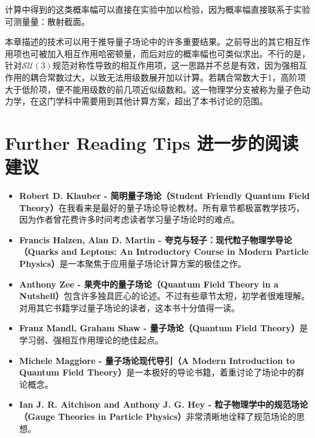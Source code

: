 计算中得到的这类概率幅可以直接在实验中加以检验，因为概率幅直接联系于实验可测量量：散射截面。

本章描述的技术可以用于推导量子场论中的许多重要结果。之前导出的其它相互作用项也可被加入相互作用哈密顿量，而后对应的概率幅也可类似求出。不行的是，针对$\mathcal{SU}(3)$规范对称性导致的相互作用项，这一思路并不总是有效，因为强相互作用的耦合常数过大，以致无法用级数展开加以计算。若耦合常数大于1，高阶项大于低阶项，便不能用级数的前几项近似级数和。这一物理学分支被称为量子色动力学，在这门学科中需要用到其他计算方案，超出了本书讨论的范围。

\section*{Further Reading Tips 进一步的阅读建议}
\begin{itemize}
\item \textbf{Robert D. Klauber - 简明量子场论（Student Friendly Quantum Field Theory）}在我看来是最好的量子场论导论教材。所有章节都极富教学技巧，因为作者曾花费许多时间考虑读者学习量子场论时的难点。
\item \textbf{Francis Halzen, Alan D. Martin - 夸克与轻子：现代粒子物理学导论（Quarks and Leptons: An Introductory Course in Modern Particle Physics）}是一本聚焦于应用量子场论计算方案的极佳之作。
\item \textbf{Anthony Zee - 果壳中的量子场论（Quantum Field Theory in a Nutshell）}包含许多独具匠心的论述。不过有些章节太短，初学者很难理解。对用其它书籍学过量子场论的读者，这本书十分值得一读。
\item \textbf{Franz Mandl, Graham Shaw - 量子场论（Quantum Field Theory）}是学习弱、强相互作用理论的绝佳起点。
\item \textbf{Michele Maggiore - 量子场论现代导引（A Modern Introduction to Quantum Field Theory）}是一本极好的导论书籍，着重讨论了场论中的群论概念。
\item \textbf{Ian J. R. Aitchison and Anthony J. G. Hey - 粒子物理学中的规范场论（Gauge Theories in
Particle Physics）}非常清晰地诠释了规范场论的思想。
\end{itemize}

